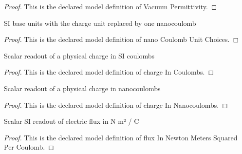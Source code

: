\begin{proof}
  This is the declared model definition of Vacuum Permittivity.
\end{proof}
\begin{definition}
  \label{def:physics:phyx-mini-0848:phyxminiproblems-problemphyxmini0848-nanocoulombunitchoices}
  SI base units with the charge unit replaced by one nanocoulomb
\end{definition}
\begin{proof}
  This is the declared model definition of nano Coulomb Unit Choices.
\end{proof}
\begin{definition}
  \label{def:physics:phyx-mini-0848:phyxminiproblems-problemphyxmini0848-chargeincoulombs}
  Scalar readout of a physical charge in SI coulombs
\end{definition}
\begin{proof}
  This is the declared model definition of charge In Coulombs.
\end{proof}
\begin{definition}
  \label{def:physics:phyx-mini-0848:phyxminiproblems-problemphyxmini0848-chargeinnanocoulombs}
  Scalar readout of a physical charge in nanocoulombs
\end{definition}
\begin{proof}
  This is the declared model definition of charge In Nanocoulombs.
\end{proof}
\begin{definition}
  \label{def:physics:phyx-mini-0848:phyxminiproblems-problemphyxmini0848-fluxinnewtonmeterssquaredpercoulomb}
  Scalar SI readout of electric flux in N m² / C
\end{definition}
\begin{proof}
  This is the declared model definition of flux In Newton Meters Squared Per Coulomb.
\end{proof}
